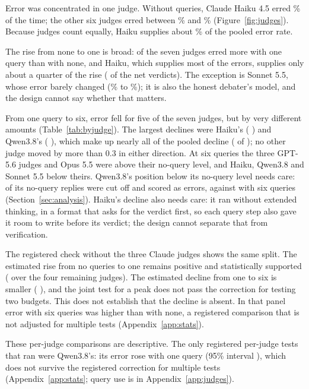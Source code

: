 Error was concentrated in one judge. Without queries, Claude Haiku 4.5 erred \errHaikuKzero\% of the time; the other
six judges erred between \errOthersKzeroLo\% and \errOthersKzeroHi\% (Figure~\ref{fig:judges}). Because judges count
equally, Haiku supplies about \haikuErrShare\% of the pooled error rate.

The rise from none to one is broad: \nJudgesHigherAtOne{} of the seven judges erred more with one query than with
none, and Haiku, which supplies most of the errors, supplies only about a quarter of the rise (\haikuNetFlips{} of
the \nNetFlips{} net verdicts). The exception is Sonnet 5.5, whose error barely changed (\errSonnetKzero\% to
\errSonnetKone\%); it is also the honest debater's model, and the design cannot say whether that matters.

From one query to six, error fell for five of the seven judges, but by very different amounts
(Table~\ref{tab:byjudge}). The largest declines were Haiku's (\dHaikuOneSix{} \pp) and Qwen3.8's (\dQwenOneSix{}
\pp), which make up nearly all of the pooled decline (\haikuQwenFall{} of \dOneSix{} \pp); no other judge moved by
more than 0.3 \pp{} in either direction. At six queries the three GPT-5.6 judges and Opus 5.5 were above their
no-query level, and Haiku, Qwen3.8 and Sonnet 5.5 below theirs. Qwen3.8's position below its no-query level needs
care: \qwenCutZero{} of its no-query replies were cut off and scored as errors, against \qwenCutSix{} with six queries
(Section~\ref{sec:analysis}). Haiku's decline also needs care: it ran without extended thinking, in a format that
asks for the verdict first, so each query step also gave it room to write before its verdict; the design cannot
separate that from verification.

The registered check without the three Claude judges shows the same split. The estimated rise from no queries to one
remains positive and statistically supported (\ncRise{} \pp{} over the four remaining judges). The estimated decline
from one to six is smaller (\ncFall{} \pp), and the joint test for a peak does not pass the correction for testing
two budgets. This does not establish that the decline is absent. In that panel error with six queries was
\ncSixZero{} \pp{} higher than with none, a registered comparison that is not adjusted for multiple tests
(Appendix~\ref{app:stats}).

These per-judge comparisons are descriptive. The only registered per-judge tests that ran were Qwen3.8's: its error rose \qwenOneZero{} \pp{} with one query (95\% interval \qwenOneZeroCI), which does not survive
the registered correction for multiple tests (Appendix~\ref{app:stats}; query use is in Appendix~\ref{app:judges}).

